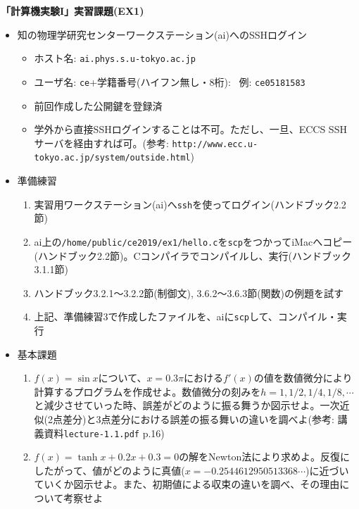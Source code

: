 \documentclass[11pt]{jarticle}
\begin{document}
\noindent
{\bf\large 「計算機実験I」実習課題(EX1)}
\\[-0.5em]

\noindent
\begin{itemize}
\item 知の物理学研究センターワークステーション(ai)へのSSHログイン
  \begin{itemize}
  \item ホスト名: {\tt ai.phys.s.u-tokyo.ac.jp}
  \item ユーザ名: {\tt ce}+学籍番号(ハイフン無し・8桁): \ 例: {\tt ce05181583}
  \item 前回作成した公開鍵を登録済
  \item 学外から直接SSHログインすることは不可。ただし、一旦、ECCS SSHサーバを経由すれば可。(参考: \verb+http://www.ecc.u-tokyo.ac.jp/system/outside.html+)
\end{itemize}
  
\item 準備練習
  \begin{enumerate}
  \item 実習用ワークステーション(ai)へ{\tt ssh}を使ってログイン(ハンドブック2.2節)
  \item ai上の{\tt /home/public/ce2019/ex1/hello.c}を{\tt scp}をつかってiMacへコピー(ハンドブック2.2節)。Cコンパイラでコンパイルし、実行(ハンドブック3.1.1節)
  \item ハンドブック3.2.1〜3.2.2節(制御文), 3.6.2〜3.6.3節(関数)の例題を試す
  \item 上記、準備練習3で作成したファイルを、aiに{\tt scp}して、コンパイル・実行
  \end{enumerate}

\item 基本課題
  \begin{enumerate}
  \item $f(x)=\sin x$について、$x=0.3\pi$における$f'(x)$の値を数値微分により計算するプログラムを作成せよ。数値微分の刻みを$h=1,1/2,1/4,1/8,\cdots$と減少させていった時、誤差がどのように振る舞うか図示せよ。一次近似(2点差分)と3点差分における誤差の振る舞いの違いを調べよ(参考: 講義資料{\tt lecture-1.1.pdf} p.16)
  \item $f(x)=\tanh x + 0.2 x + 0.3 = 0$の解をNewton法により求めよ。反復にしたがって、値がどのように真値($x=-0.2544612950513368\cdots$)に近づいていくか図示せよ。また、初期値による収束の違いを調べ、その理由について考察せよ
  \end{enumerate}
  

\end{itemize}
\end{document}
